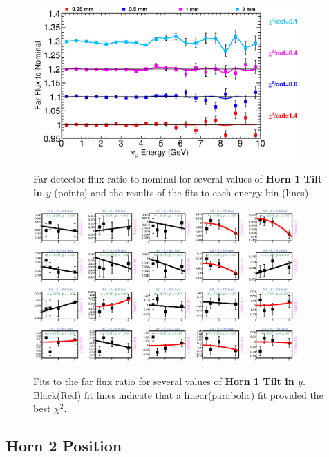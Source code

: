 \begin{figure}[ht]
  \begin{center}
    {\includegraphics[width=4.0in]{figures/Horn1YTilt_far_summary.eps}}
  \end{center}
\caption{ Far detector flux ratio to nominal for several values of {\bf Horn 1 Tilt in $y$} (points) and the results of the fits to each energy bin (lines).}
\end{figure}


\begin{figure}[hb]
  \begin{center}
    {\includegraphics[width=4.0in]{figures/Horn1YTilt_far_fits.eps}}
  \end{center}
\caption{ Fits to the far flux ratio for several values of {\bf Horn 1 Tilt in $y$}. Black(Red) fit lines indicate that a linear(parabolic) fit provided the best $\chi^2$. }
\end{figure}

\clearpage
\subsection{Horn 2 Position}

